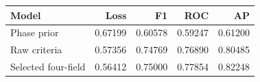 \begin{tabular}{lrrrr}
\toprule
Model & Loss & F1 & ROC & AP \\
\midrule
Phase prior & 0.67199 & 0.60578 & 0.59247 & 0.61200 \\
Raw criteria & 0.57356 & 0.74769 & 0.76890 & 0.80485 \\
Selected four-field & 0.56412 & 0.75000 & 0.77854 & 0.82248 \\
\bottomrule
\end{tabular}
